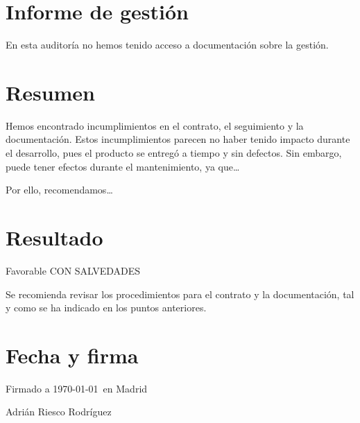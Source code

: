 
\section*{Informe de gesti\'on}

En esta auditor\'ia no hemos tenido acceso a documentaci\'on sobre la gesti\'on.


\section*{Resumen}

Hemos encontrado incumplimientos en el contrato, el seguimiento y la
documentaci\'on. Estos incumplimientos parecen no haber tenido impacto durante el
desarrollo, pues el producto se entreg\'o a tiempo y sin defectos. Sin embargo,
puede tener efectos durante el mantenimiento, ya que\ldots {}

Por ello, recomendamos\ldots {}

\section*{Resultado}

{\huge Favorable CON SALVEDADES}

\vspace{3ex}

Se recomienda revisar los procedimientos para el contrato y la documentaci\'on,
tal y como se ha indicado en los puntos anteriores.

\section*{Fecha y firma}

Firmado a \today\ en Madrid

\vspace{10ex}

Adri\'an Riesco Rodr\'iguez


